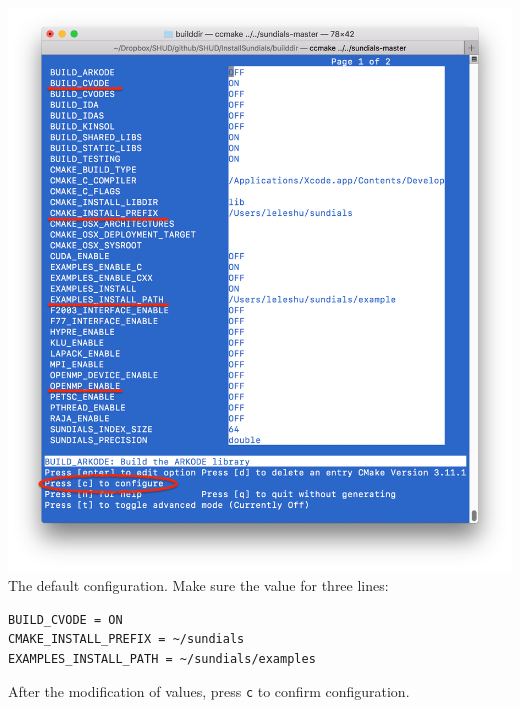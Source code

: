 \documentclass[]{scrbook}
\begin{document}
\includegraphics{Fig/ccmake/2.png} The default configuration. Make sure
the value for three lines:

\begin{verbatim}
BUILD_CVODE = ON
CMAKE_INSTALL_PREFIX = ~/sundials
EXAMPLES_INSTALL_PATH = ~/sundials/examples
\end{verbatim}

After the modification of values, press \texttt{c} to confirm
configuration.
\end{document}

